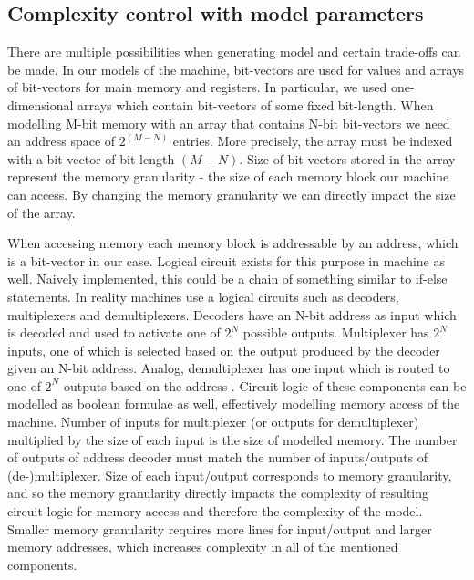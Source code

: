 \documentclass[12pt]{article}
\begin{document}
\subsection{Complexity control with model parameters}

There are multiple possibilities when generating model and certain trade-offs
can be made. In our models of the machine, bit-vectors are used for values and
arrays of bit-vectors for main memory and registers. In particular, we used
one-dimensional arrays which contain bit-vectors of some fixed bit-length. When
modelling M-bit memory with an array that contains N-bit bit-vectors we need an
address space of $2^{(M - N)}$ entries. More precisely, the array must be
indexed with a bit-vector of bit length $(M - N)$. Size of bit-vectors stored
in the array represent the memory granularity - the size of each memory block
our machine can access. By changing the memory granularity we can directly
impact the size of the array.

When accessing memory each memory block is addressable by an address, which is
a bit-vector in our case. Logical circuit exists for this purpose in machine as
well. Naively implemented, this could be a chain of something similar to
if-else statements. In reality machines use a logical circuits such as
decoders, multiplexers and demultiplexers. Decoders have an N-bit address as
input which is decoded and used to activate one of $2^N$ possible outputs.
Multiplexer has $2^N$ inputs, one of which is selected based on the output
produced by the decoder given an N-bit address. Analog, demultiplexer has one
input which is routed to one of $2^N$ outputs based on the address
\cite{horowitz1989art}. Circuit logic of these components can be modelled as
boolean formulae as well, effectively modelling memory access of the machine.
Number of inputs for multiplexer (or outputs for demultiplexer) multiplied by
the size of each input is the size of modelled memory. The number of outputs of
address decoder must match the number of inputs/outputs of (de-)multiplexer.
Size of each input/output corresponds to memory granularity, and so the memory
granularity directly impacts the complexity of resulting circuit logic for
memory access and therefore the complexity of the model. Smaller memory
granularity requires more lines for input/output and larger memory addresses,
which increases complexity in all of the mentioned components.
\end{document}
